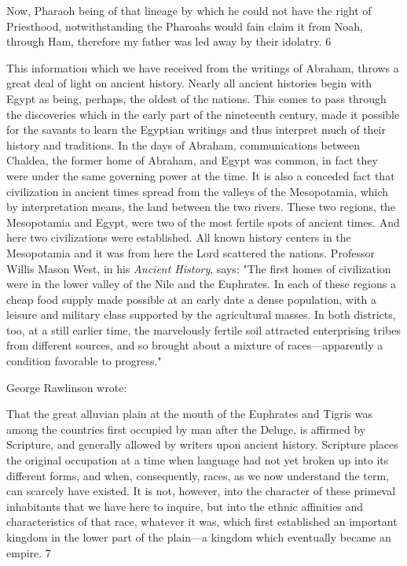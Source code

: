 Now, Pharaoh being of that lineage by which he could not have the right of Priesthood,
notwithstanding the Pharoahs would fain claim it from Noah, through Ham, therefore my
father was led away by their idolatry. 6

This information which we have received from the writings of Abraham, throws a great deal
of light on ancient history. Nearly all ancient histories begin with Egypt as being, perhaps,
the oldest of the nations. This comes to pass through the discoveries which in the early part
of the nineteenth century, made it possible for the savants to learn the Egyptian writings and
thus interpret much of their history and traditions. In the days of Abraham, communications
between Chaldea, the former home of Abraham, and Egypt was common, in fact they were
under the same governing power at the time. It is also a conceded fact that civilization in
ancient times spread from the valleys of the Mesopotamia, which by interpretation means,
the land between the two rivers. These two regions, the Mesopotamia and Egypt, were two of
the most fertile spots of ancient times. And here two civilizations were established. All
known history centers in the Mesopotamia and it was from here the Lord scattered the
nations. Professor Willis Mason West, in his \textit{Ancient History}, says: "The first homes of
civilization were in the lower valley of the Nile and the Euphrates. In each of these regions a
cheap food supply made possible at an early date a dense population, with a leisure and
military class supported by the agricultural masses. In both districts, too, at a still earlier
time, the marvelously fertile soil attracted enterprising tribes from different sources, and so
brought about a mixture of races—apparently a condition favorable to progress."

George Rawlinson wrote:

That the great alluvian plain at the mouth of the Euphrates and Tigris was among the
countries first occupied by man after the Deluge, is affirmed by Scripture, and generally
allowed by writers upon ancient history. Scripture places the original occupation at a time
when language had not yet broken up into its different forms, and when, consequently, races,
as we now understand the term, can scarcely have existed. It is not, however, into the
character of these primeval inhabitants that we have here to inquire, but into the ethnic
affinities and characteristics of that race, whatever it was, which first established an
important kingdom in the lower part of the plain—a kingdom which eventually became an
empire. 7

